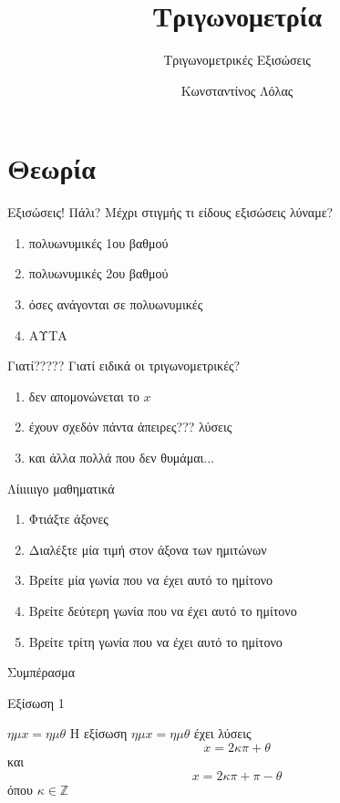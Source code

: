 \documentclass{presentation}
\title{Τριγωνομετρία}
\subtitle{Τριγωνομετρικές Εξισώσεις}
\author[Λόλας]{Κωνσταντίνος Λόλας}
\date{}
\begin{document}
\begin{frame}
  \titlepage
\end{frame}

\section{Θεωρία}
\begin{frame}{Εξισώσεις! Πάλι?}
  Μέχρι στιγμής τι είδους εξισώσεις λύναμε?
  \begin{enumerate}
    \item<1-> πολυωνυμικές 1ου βαθμού
    \item<2-> πολυωνυμικές 2ου βαθμού
    \item<3-> όσες ανάγονται σε πολυωνυμικές
    \item<4-> ΑΥΤΑ
  \end{enumerate}
\end{frame}

\begin{frame}{Γιατί?????}
  Γιατί ειδικά οι τριγωνομετρικές?
  \begin{enumerate}
    \item<1-> δεν απομονώνεται το $x$
    \item<2-> έχουν σχεδόν πάντα άπειρες??? λύσεις
    \item<3-> και άλλα πολλά που δεν θυμάμαι...
  \end{enumerate}
\end{frame}

\begin{frame}{Λίιιιιιγο μαθηματικά}
  \begin{enumerate}
    \item<1-> Φτιάξτε άξονες
    \item<2-> Διαλέξτε μία τιμή στον άξονα των ημιτώνων
    \item<3-> Βρείτε μία γωνία που να έχει αυτό το ημίτονο
    \item<4-> Βρείτε δεύτερη γωνία που να έχει αυτό το ημίτονο
    \item<5-> Βρείτε τρίτη γωνία που να έχει αυτό το ημίτονο
  \end{enumerate}
   Συμπέρασμα

\end{frame}

\begin{frame}{Εξίσωση 1}
  \begin{block}{$ημx=ημθ$}
    Η εξίσωση $ημx=ημθ$ έχει λύσεις
    $$x=2κπ+θ$$
    και
    $$x=2κπ+π-θ$$
    όπου $κ\in\mathbb{Z}$
  \end{block}
\end{frame}
\end{document}
